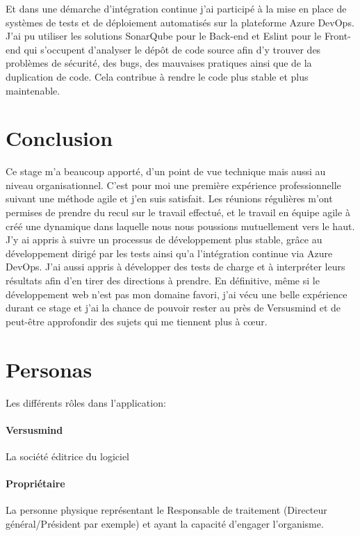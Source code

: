 \documentclass[12pt, a4paper]{report}
\begin{document}
        Et dans une démarche d'intégration continue j'ai participé à la mise en place de systèmes de tests et de déploiement automatisés sur la plateforme Azure DevOps.\newline
        J'ai pu utiliser les solutions SonarQube pour le Back-end et Eslint pour le Front-end qui s'occupent d'analyser le dépôt de code source afin d'y trouver des problèmes de sécurité, des bugs, des mauvaises pratiques ainsi que de la duplication de code.\newline
        Cela contribue à rendre le code plus stable et plus maintenable.\newline
\chapter{Conclusion}
    Ce stage m'a beaucoup apporté, d'un point de vue technique mais aussi au niveau organisationnel.\newline
    C'est pour moi une première expérience professionnelle suivant une méthode agile et j'en suis satisfait.
    Les réunions régulières m'ont permises de prendre du recul sur le travail effectué, et le travail en équipe agile à créé une dynamique dans laquelle nous nous poussions mutuellement vers le haut.\newline
    J'y ai appris à suivre un processus de développement plus stable, grâce au développement dirigé par les tests ainsi qu'a l'intégration continue via Azure DevOps.\newline
    J'ai aussi appris à développer des tests de charge et à interpréter leurs résultats afin d'en tirer des directions à prendre.\newline
    En définitive, même si le développement web n'est pas mon domaine favori, j'ai vécu une belle expérience durant ce stage et j'ai la chance de pouvoir rester au près de Versusmind et de peut-être approfondir des sujets qui me tiennent plus à cœur.
\appendix
\chapter{Personas}
    Les différents rôles dans l'application:
    \subsubsection{Versusmind}
        La société éditrice du logiciel
    \subsubsection{Propriétaire}
        La personne physique représentant le Responsable de traitement (Directeur général/Président par exemple) et ayant la capacité d'engager l'organisme.
\end{document}
